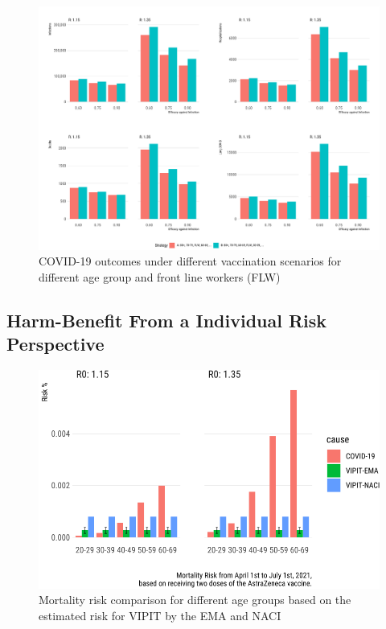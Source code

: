 \documentclass[]{interact}
\theoremstyle{plain}%
\theoremstyle{definition}
\theoremstyle{remark}
\begin{document}
\begin{figure}

{\centering \includegraphics[width=1\linewidth]{../figures/fig-barplots} 

}

\caption{COVID-19 outcomes under different vaccination scenarios for different age group and front line workers (FLW)}\label{fig:fig2}
\end{figure}

\hypertarget{harm-benefit-from-a-individual-risk-perspective}{%
\subsection{Harm-Benefit From a Individual Risk
Perspective}\label{harm-benefit-from-a-individual-risk-perspective}}

\begin{figure}

{\centering \includegraphics[width=0.9\linewidth]{theCaseforAZ_files/figure-latex/covidvsvipit-1} 

}

\caption{Mortality risk comparison for different age groups based on the estimated risk for VIPIT by the EMA and NACI}\label{fig:covidvsvipit}
\end{figure}
\end{document}
